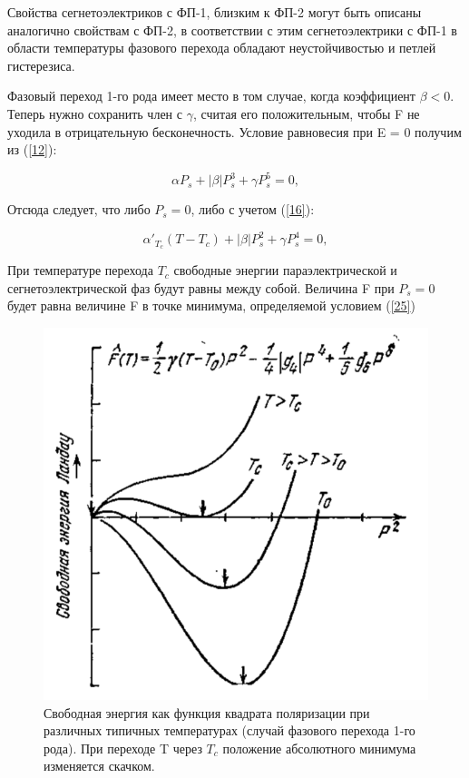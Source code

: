 \documentclass[a4paper]{article}
\begin{document}
Свойства сегнетоэлектриков с ФП-1, близким к ФП-2 могут быть описаны аналогично свойствам с ФП-2, в соответствии с этим сегнетоэлектрики с ФП-1 в области температуры фазового перехода обладают неустойчивостью и петлей гистерезиса. 

Фазовый переход 1-го рода имеет место в том случае, когда коэффициент  $\beta < 0$. Теперь нужно сохранить член с $\gamma$, считая его положительным, чтобы F не уходила в отрицательную бесконечность. Условие равновесия при E = 0 получим из (\ref{12}):

\begin{equation}
\alpha P_s + |\beta| P^3_s + \gamma P^5_s = 0,
\label{24}
\end{equation}

Отсюда следует, что либо $P_s = 0$, либо с учетом (\ref{16}):

\begin{equation}
\alpha'_{T_c} (T - T_c) + |\beta| P^2_s + \gamma P^4_s = 0,
\label{25}
\end{equation}

При температуре перехода $T_c$ свободные энергии параэлектрической и сегнетоэлектрической фаз будут равны между собой. Величина F при $P_s = 0$ будет равна величине F  в точке минимума, определяемой условием (\ref{25})

\begin{figure}[H]
\begin{center}
\includegraphics[scale = 0.7]{p7.png}
\caption{Свободная энергия как функция квадрата поляризации при различных типичных температурах (случай фазового перехода 1-го рода). При переходе T через $T_c$ положение абсолютного минимума изменяется скачком. }
\label{p7}
\end{center}
\end{figure}
\end{document}
